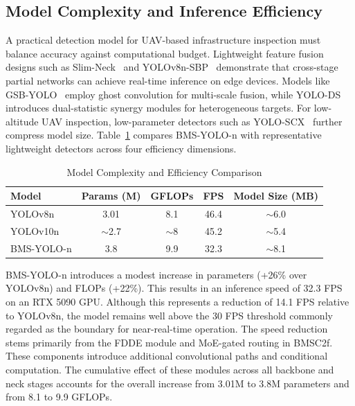 \documentclass{ieeeaccess}
\begin{document}
\subsection{Model Complexity and Inference Efficiency}
\label{sec:complexity}

A practical detection model for UAV-based infrastructure inspection must balance accuracy against computational budget. Lightweight feature fusion designs such as Slim-Neck~\cite{ye2025yolov8nsbp} and YOLOv8n-SBP~\cite{ye2025yolov8nsbp} demonstrate that cross-stage partial networks can achieve real-time inference on edge devices. Models like GSB-YOLO~\cite{li2024lcsnet} employ ghost convolution for multi-scale fusion, while YOLO-DS~\cite{wang2026directionaware} introduces dual-statistic synergy modules for heterogeneous targets. For low-altitude UAV inspection, low-parameter detectors such as YOLO-SCX~\cite{liu2025freqyolo} further compress model size. Table~\ref{tab:complexity} compares BMS-YOLO-n with representative lightweight detectors across four efficiency dimensions.

\begin{table}[!t]
\caption{Model Complexity and Efficiency Comparison}
\label{tab:complexity}
\centering
\setlength{\tabcolsep}{4pt}
\begin{tabular}{lcccc}
\toprule
Model & Params (M) & GFLOPs & FPS & Model Size (MB) \\
\midrule
YOLOv8n  & 3.01 & 8.1 & 46.4 & $\sim$6.0 \\
YOLOv10n & $\sim$2.7 & $\sim$8 & 45.2 & $\sim$5.4 \\
BMS-YOLO-n & 3.8 & 9.9 & 32.3 & $\sim$8.1 \\
\bottomrule
\end{tabular}
\end{table}

BMS-YOLO-n introduces a modest increase in parameters (+26\% over YOLOv8n) and FLOPs (+22\%). This results in an inference speed of 32.3 FPS on an RTX 5090 GPU. Although this represents a reduction of 14.1 FPS relative to YOLOv8n, the model remains well above the 30 FPS threshold commonly regarded as the boundary for near-real-time operation. The speed reduction stems primarily from the FDDE module and MoE-gated routing in BMSC2f. These components introduce additional convolutional paths and conditional computation. The cumulative effect of these modules across all backbone and neck stages accounts for the overall increase from 3.01M to 3.8M parameters and from 8.1 to 9.9 GFLOPs.
\end{document}
